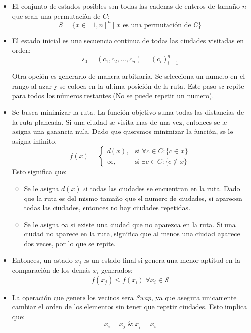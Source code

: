 \documentclass[12pt,twoside]{article}
\begin{document}
	\begin{itemize}
		\item El conjunto de estados posibles son todas las cadenas de enteros de tamaño $n$ que sean una permutación de $C$: \[ S = \{ x \in [1, n]^n \;|\; x \text{ es una permutación de } C \} \]
		
		\item El estado inicial es una secuencia continua de todas las ciudades visitadas en orden: 
		\[ s_0 = (c_1 ,c_2, \dots, c_n) = (c_i)_{i =1}^n \]
		
		Otra opción es generarlo de manera arbitraria. Se selecciona un numero en el rango al azar y se coloca en la ultima posición de la ruta. Este paso se repite para todos los números restantes (No se puede repetir un numero). 
	
		\item Se busca minimizar la ruta. La función objetivo suma todas las distancias de la ruta planeada. Si una ciudad se visita mas de una vez, entonces se le asigna una ganancia nula. Dado que queremos minimizar la función, se le asigna infinito.
		\[
		f(x) =
		\begin{cases} 
			d(x), & \text{si } \forall c \in C \colon \{ c \in x \} \\ 
			\infty, & \text{si } \exists c \in C \colon \{c \notin x\}
		\end{cases}
		\]
		Esto significa que:
		\begin{itemize}
			\item Se le asigna $d(x)$ si todas las ciudades se encuentran en la ruta. Dado que la ruta es del mismo tamaño que el numero de ciudades, si aparecen todas las ciudades, entonces no hay ciudades repetidas.
			\item Se le asigna $\infty$ si existe una ciudad que no aparezca en la ruta. Si una ciudad no aparece en la ruta, significa que al menos una ciudad aparece dos veces, por lo que se repite.
		\end{itemize}
	
	\item Entonces, un estado $x_j$ es un estado final si genera una menor aptitud en la comparación de los demás $x_i$ generados: \[ f(x_j) \leq f(x_i) \; \forall x_i \in S \]
	
	\item La operación que genere los vecinos sera \textit{Swap}, ya que asegura unicamente cambiar el orden de los elementos sin tener que repetir ciudades. Esto implica que: \[ x_i = x_j \; \&  \; x_j = x_i \]
	
	\end{itemize}
	
\end{document}
